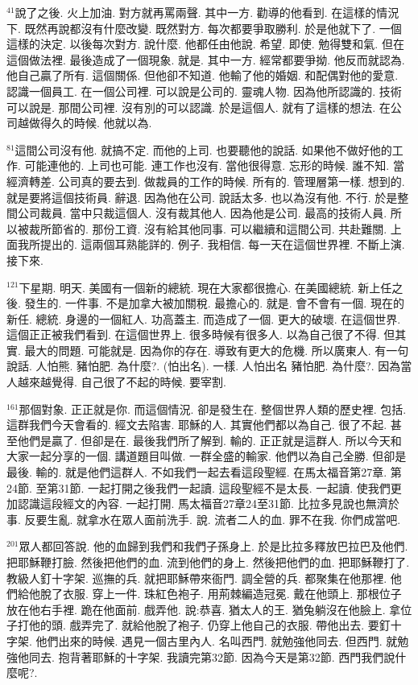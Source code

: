 \documentclass{book}
\begin{document}
$^{41}$說了之後.
火上加油.
對方就再罵兩聲.
其中一方.
勸導的他看到.
在這樣的情況下.
既然再說都沒有什麼改變.
既然對方.
每次都要爭取勝利.
於是他就下了.
一個這樣的決定.
以後每次對方.
說什麼.
他都任由他說.
希望.
即使.
勉得雙和氣.
但在這個做法裡.
最後造成了一個現象.
就是.
其中一方.
經常都要爭拗.
他反而就認為.
他自己贏了所有.
這個關係.
但他卻不知道.
他輸了他的婚姻.
和配偶對他的愛意.
認識一個員工.
在一個公司裡.
可以說是公司的.
靈魂人物.
因為他所認識的.
技術可以說是.
那間公司裡.
沒有別的可以認識.
於是這個人.
就有了這樣的想法.
在公司越做得久的時候.
他就以為.

$^{81}$這間公司沒有他.
就搞不定.
而他的上司.
也要聽他的說話.
如果他不做好他的工作.
可能連他的.
上司也可能.
連工作也沒有.
當他很得意.
忘形的時候.
誰不知.
當經濟轉差.
公司真的要去到.
做裁員的工作的時候.
所有的.
管理層第一樣.
想到的.
就是要將這個技術員.
辭退.
因為他在公司.
說話太多.
也以為沒有他.
不行.
於是整間公司裁員.
當中只裁這個人.
沒有裁其他人.
因為他是公司.
最高的技術人員.
所以被裁所節省的.
那份工資.
沒有給其他同事.
可以繼續和這間公司.
共赴難關.
上面我所提出的.
這兩個耳熟能詳的.
例子.
我相信.
每一天在這個世界裡.
不斷上演.
接下來.

$^{121}$下星期.
明天.
美國有一個新的總統.
現在大家都很擔心.
在美國總統.
新上任之後.
發生的.
一件事.
不是加拿大被加關稅.
最擔心的.
就是.
會不會有一個.
現在的新任.
總統.
身邊的一個紅人.
功高蓋主.
而造成了一個.
更大的破壞.
在這個世界.
這個正正被我們看到.
在這個世界上.
很多時候有很多人.
以為自己很了不得.
但其實.
最大的問題.
可能就是.
因為你的存在.
導致有更大的危機.
所以廣東人.
有一句說話.
人怕熊.
豬怕肥.
為什麼?.
(怕出名).
一樣.
人怕出名 豬怕肥.
為什麼?.
因為當人越來越覺得.
自己很了不起的時候.
要宰割.

$^{161}$那個對象.
正正就是你.
而這個情況.
卻是發生在.
整個世界人類的歷史裡.
包括.
這群我們今天會看的.
經文去陷害.
耶穌的人.
其實他們都以為自己.
很了不起.
甚至他們是贏了.
但卻是在.
最後我們所了解到.
輸的.
正正就是這群人.
所以今天和大家一起分享的一個.
講道題目叫做.
一群全盛的輸家.
他們以為自己全勝.
但卻是最後.
輸的.
就是他們這群人.
不如我們一起去看這段聖經.
在馬太福音第27章.
第24節.
至第31節.
一起打開之後我們一起讀.
這段聖經不是太長.
一起讀.
使我們更加認識這段經文的內容.
一起打開.
馬太福音27章24至31節.
比拉多見說也無濟於事.
反要生亂.
就拿水在眾人面前洗手.
說.
流者二人的血.
罪不在我.
你們成當吧.

$^{201}$眾人都回答說.
他的血歸到我們和我們子孫身上.
於是比拉多釋放巴拉巴及他們.
把耶穌鞭打臉.
然後把他們的血.
流到他們的身上.
然後把他們的血.
把耶穌鞭打了.
教級人釘十字架.
巡撫的兵.
就把耶穌帶來衙門.
調全營的兵.
都聚集在他那裡.
他們給他脫了衣服.
穿上一件.
珠紅色袍子.
用荊棘編造冠冕.
戴在他頭上.
那根位子放在他右手裡.
跪在他面前.
戲弄他.
說:恭喜.
猶太人的王.
猶兔躺沒在他臉上.
拿位子打他的頭.
戲弄完了.
就給他脫了袍子.
仍穿上他自己的衣服.
帶他出去.
要釘十字架.
他們出來的時候.
遇見一個古里內人.
名叫西門.
就勉強他同去.
但西門.
就勉強他同去.
抱背著耶穌的十字架.
我讀完第32節.
因為今天是第32節.
西門我們說什麼呢?.
\end{document}
